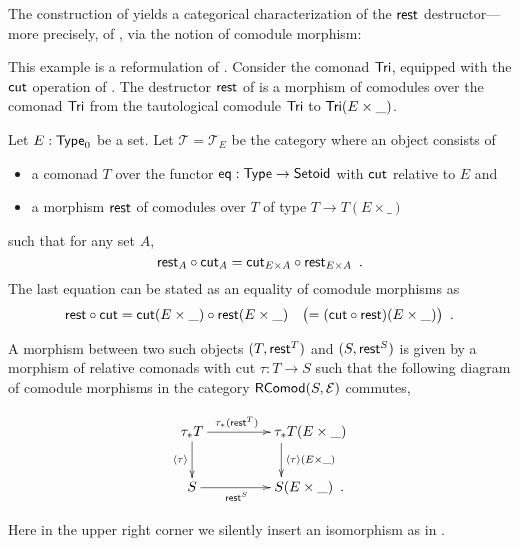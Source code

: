 \documentclass{amsart}
\begin{document}
The construction of  yields a categorical characterization of the $\mathsf{rest}$ destructor---%
more precisely, of , via the notion of comodule morphism:

\begin{example}\label{ex:tail_comodule_alternative}
This example is a reformulation of .
 Consider the comonad $\mathsf{Tri}$, equipped with the $\mathsf{cut}$ operation of .
 The destructor $\mathsf{rest}$ of  is a morphism of comodules over the comonad $\mathsf{Tri}$ 
  from the tautological comodule  $\mathsf{Tri}$ to $\mathsf{Tri}(E\times \_)$.
  
\end{example}



\begin{definition}\label{def:cat_tri}
   Let $E:\mathsf{Type}_0$ be a set.
   Let $\mathcal{T} = \mathcal{T}_E$ be the category where an object consists of
   \begin{itemize}
    \item a comonad $T$ over the functor $\mathsf{eq}:\mathsf{Type}\to\mathsf{Setoid}$ with $\mathsf{cut}$ relative to $E$ and
    \item a morphism $\mathsf{rest}$ of comodules over $T$ of type $T \to T(E\times \_)$
   \end{itemize}
   such that for any set $A$,
    \[ {\mathsf{rest}_A} \circ {\ensuremath{\mathsf{cut}}_A} = {\mathsf{cut}_{E\times A}} \circ {\ensuremath{\mathsf{rest}}_{E\times A}} \enspace . \]
   The last equation can be stated as an equality of comodule morphisms as
     \[ {\mathsf{rest}} \circ {\ensuremath{\mathsf{cut}}} = {\mathsf{cut}(E\times\_)} \circ {\ensuremath{\mathsf{rest}}(E\times \_)} \quad \bigl( = ({\mathsf{cut}} \circ {\ensuremath{\mathsf{rest}}})(E\times \_)\bigr)\enspace . \]

  
   
   A morphism between two such objects $(T,\mathsf{rest}^T)$ and $(S,\mathsf{rest}^S)$
   is given by a morphism of relative comonads with cut $\tau : T \to S$ such that
   the following diagram of comodule morphisms in the category $\mathsf{RComod}(S,\mathcal{E})$ commutes,
   
   \[ \begin{xy}
       \xymatrix{   \tau_*T  \ar[r]^{\tau_*(\tail^T)} \ar[d]_{\induced{\tau}}  &  **[r] \tau_*T (E\times \_ )\ar[d]^{\induced{\tau}(E\times \_)} \\
                    S  \ar[r]_{\tail^S}  &  **[r] S (E\times \_ ) \enspace .
        }
      \end{xy}
   \]

   \noindent
   Here in the upper right corner we silently insert an isomorphism as in .
\end{definition}   
   
\end{document}
